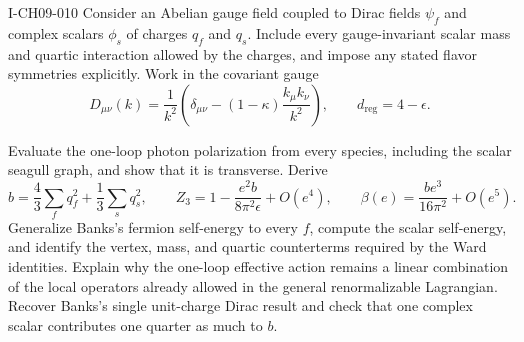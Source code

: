 \begin{exercise}{I-CH09-010}
Consider an Abelian gauge field coupled to Dirac fields $\psi_f$ and complex
scalars $\phi_s$ of charges $q_f$ and $q_s$.  Include every gauge-invariant
scalar mass and quartic interaction allowed by the charges, and impose any
stated flavor symmetries explicitly.  Work in the covariant gauge
\[
  D_{\mu\nu}(k)=\frac{1}{k^2}
  \left(\delta_{\mu\nu}-(1-\kappa)\frac{k_\mu k_\nu}{k^2}\right),
  \qquad d_{\mathrm{reg}}=4-\epsilon.
\]

Evaluate the one-loop photon polarization from every species, including the
scalar seagull graph, and show that it is transverse.  Derive
\[
  b=\frac43\sum_fq_f^2+\frac13\sum_sq_s^2,
  \qquad
  Z_3=1-\frac{e^2b}{8\pi^2\epsilon}+O(e^4),
  \qquad
  \beta(e)=\frac{b e^3}{16\pi^2}+O(e^5).
\]
Generalize Banks's fermion self-energy to every $f$, compute the scalar
self-energy, and identify the vertex, mass, and quartic counterterms required
by the Ward identities.  Explain why the one-loop effective action remains a
linear combination of the local operators already allowed in the general
renormalizable Lagrangian.  Recover Banks's single unit-charge Dirac result
and check that one complex scalar contributes one quarter as much to $b$.
\end{exercise}
